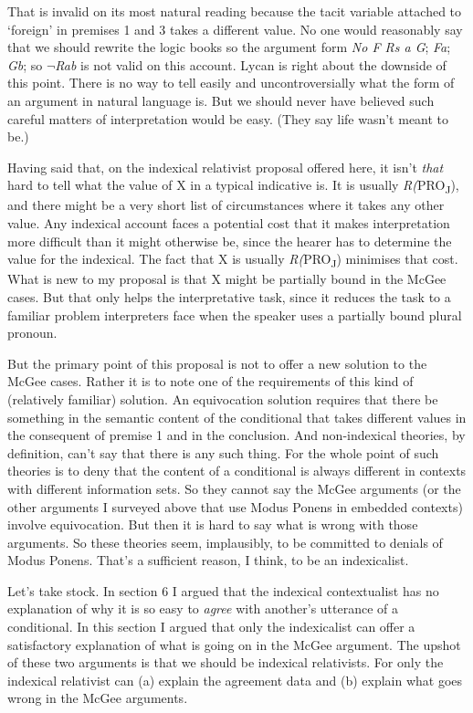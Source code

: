 \documentclass[
  11pt,
  letterpaper,
  DIV=11,
  numbers=noendperiod,
  oneside]{scrartcl}
\begin{document}
That is invalid on its most natural reading because the tacit variable
attached to `foreign' in premises 1 and 3 takes a different value. No
one would reasonably say that we should rewrite the logic books so the
argument form \emph{No F Rs a G}; \emph{Fa}; \emph{Gb}; so
\(\neg\)\emph{Rab} is not valid on this account. Lycan is right about
the downside of this point. There is no way to tell easily and
uncontroversially what the form of an argument in natural language is.
But we should never have believed such careful matters of interpretation
would be easy. (They say life wasn't meant to be.)

Having said that, on the indexical relativist proposal offered here, it
isn't \emph{that} hard to tell what the value of X in a typical
indicative is. It is usually \emph{R(}PRO\textsubscript{J}), and there
might be a very short list of circumstances where it takes any other
value. Any indexical account faces a potential cost that it makes
interpretation more difficult than it might otherwise be, since the
hearer has to determine the value for the indexical. The fact that X is
usually \emph{R(}PRO\textsubscript{J}) minimises that cost. What is new
to my proposal is that X might be partially bound in the McGee cases.
But that only helps the interpretative task, since it reduces the task
to a familiar problem interpreters face when the speaker uses a
partially bound plural pronoun.

But the primary point of this proposal is not to offer a new solution to
the McGee cases. Rather it is to note one of the requirements of this
kind of (relatively familiar) solution. An equivocation solution
requires that there be something in the semantic content of the
conditional that takes different values in the consequent of premise 1
and in the conclusion. And non-indexical theories, by definition, can't
say that there is any such thing. For the whole point of such theories
is to deny that the content of a conditional is always different in
contexts with different information sets. So they cannot say the McGee
arguments (or the other arguments I surveyed above that use Modus Ponens
in embedded contexts) involve equivocation. But then it is hard to say
what is wrong with those arguments. So these theories seem, implausibly,
to be committed to denials of Modus Ponens. That's a sufficient reason,
I think, to be an indexicalist.

Let's take stock. In section 6 I argued that the indexical contextualist
has no explanation of why it is so easy to \emph{agree} with another's
utterance of a conditional. In this section I argued that only the
indexicalist can offer a satisfactory explanation of what is going on in
the McGee argument. The upshot of these two arguments is that we should
be indexical relativists. For only the indexical relativist can (a)
explain the agreement data and (b) explain what goes wrong in the McGee
arguments.
\end{document}
